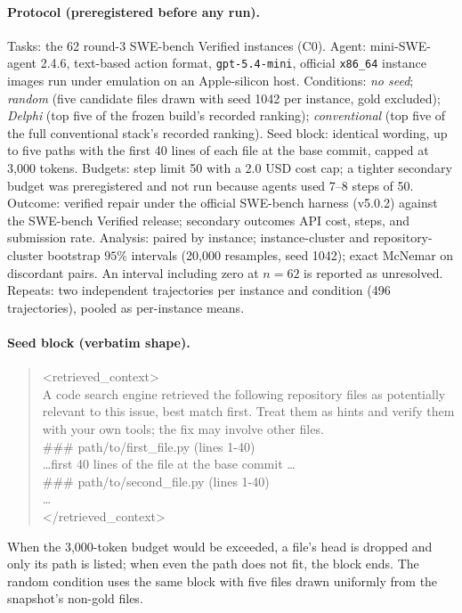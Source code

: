\documentclass{article}
\newcommand{\system}{Delphi}
\begin{document}
\paragraph{Protocol (preregistered before any run).} Tasks: the 62 round-3 SWE-bench Verified instances (C0). Agent: mini-SWE-agent 2.4.6, text-based action format, \texttt{gpt-5.4-mini}, official \texttt{x86\_64} instance images run under emulation on an Apple-silicon host. Conditions: \emph{no seed}; \emph{random} (five candidate files drawn with seed 1042 per instance, gold excluded); \emph{\system{}} (top five of the frozen build's recorded ranking); \emph{conventional} (top five of the full conventional stack's recorded ranking). Seed block: identical wording, up to five paths with the first 40 lines of each file at the base commit, capped at 3{,}000 tokens. Budgets: step limit 50 with a 2.0 USD cost cap; a tighter secondary budget was preregistered and not run because agents used 7--8 steps of 50. Outcome: verified repair under the official SWE-bench harness (v5.0.2) against the SWE-bench Verified release; secondary outcomes API cost, steps, and submission rate. Analysis: paired by instance; instance-cluster and repository-cluster bootstrap $95\%$ intervals (20{,}000 resamples, seed 1042); exact McNemar on discordant pairs. An interval including zero at $n{=}62$ is reported as unresolved. Repeats: two independent trajectories per instance and condition (496 trajectories), pooled as per-instance means.

\paragraph{Seed block (verbatim shape).}
\begin{quote}\footnotesize\ttfamily
<retrieved\_context>\\
A code search engine retrieved the following repository files as potentially relevant to this issue, best match first. Treat them as hints and verify them with your own tools; the fix may involve other files.\\[2pt]
\#\#\# path/to/first\_file.py (lines 1-40)\\
\ldots first 40 lines of the file at the base commit \ldots\\[2pt]
\#\#\# path/to/second\_file.py (lines 1-40)\\
\ldots\\
</retrieved\_context>
\end{quote}
When the 3{,}000-token budget would be exceeded, a file's head is dropped and only its path is listed; when even the path does not fit, the block ends. The random condition uses the same block with five files drawn uniformly from the snapshot's non-gold files.
\end{document}
